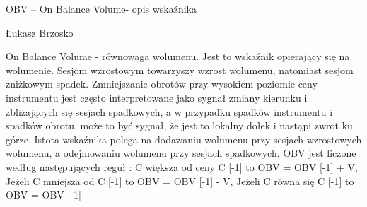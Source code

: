 \documentclass[12pt,a4paper]{article}
\begin{document}
\begin{center}
\begin{large}
OBV -- On Balance Volume-  opis wskaźnika  \\
\end{large}
Łukasz Brzosko
\end{center}

On Balance Volume - równowaga wolumenu. Jest to wskaźnik opierający się na wolumenie. Sesjom wzrostowym towarzyszy wzrost wolumenu, natomiast sesjom zniżkowym spadek. Zmniejszanie obrotów przy wysokiem poziomie ceny instrumentu jest często interpretowane jako sygnał zmiany kierunku i zbliżających się sesjach spadkowych, a w przypadku spadków instrumentu i spadków obrotu, może to być sygnał, że jest to lokalny dołek i nastąpi zwrot ku górze. Istota wskaźnika polega na dodawaniu wolumenu przy sesjach wzrostowych wolumenu, a odejmowaniu wolumenu przy sesjach spadkowych.  OBV jest liczone według następujących reguł   : C  większa od ceny C [-1] to OBV = OBV [-1] + V, Jeżeli C mniejsza od C [-1] to OBV = OBV [-1] - V, Jeżeli C równa się C [-1] to OBV = OBV [-1]



\noindent
\end{document}
